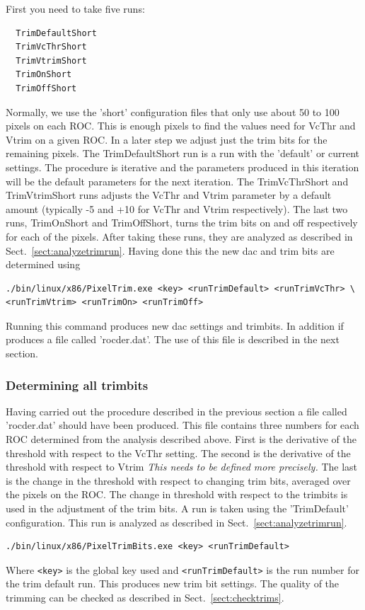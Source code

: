 First you need to take five runs:
\begin{verbatim}
  TrimDefaultShort
  TrimVcThrShort
  TrimVtrimShort
  TrimOnShort
  TrimOffShort
\end{verbatim}
Normally, we use the 'short' configuration files that only use about 50 to 100 pixels on each ROC. This is enough pixels to find the  values need for VcThr and Vtrim on a given ROC. In a later step we  adjust just the trim bits for the remaining pixels. The TrimDefaultShort run is a run with the 'default' or current settings. The procedure is iterative and the parameters produced in this iteration will be the default parameters for the next iteration. The TrimVcThrShort and TrimVtrimShort runs adjusts the VcThr and Vtrim parameter by a default amount (typically -5 and +10 for VcThr and Vtrim respectively). The last two runs, TrimOnShort and TrimOffShort, turns the trim bits on and off respectively for each of the pixels. 
After taking these runs, they are analyzed as described in Sect.~\ref{sect:analyzetrimrun}. Having done this the new dac and trim bits are determined using
\begin{verbatim}
./bin/linux/x86/PixelTrim.exe <key> <runTrimDefault> <runTrimVcThr> \
<runTrimVtrim> <runTrimOn> <runTrimOff>
\end{verbatim}
Running this command produces new dac settings and trimbits. In addition if produces a file called 'rocder.dat'. The use of this file is described in the next section.

\subsubsection{Determining all trimbits}
\label{sec:trimbits}
Having carried out the procedure described in the previous section a file called 'rocder.dat' should have been produced. This file contains three numbers for each ROC determined from the analysis described above. First is the derivative of the threshold with respect to the VcThr setting. The second is the derivative of the threshold with respect to Vtrim {\it This needs to be defined more precisely.} The last is the change in the threshold with respect to changing trim bits, averaged over the pixels on the ROC. The change in threshold with respect to the  trimbits is used in the adjustment of the trim bits. 
A run is taken using the 'TrimDefault' configuration. This run is analyzed as described in Sect.~\ref{sect:analyzetrimrun}.
\begin{verbatim}
./bin/linux/x86/PixelTrimBits.exe <key> <runTrimDefault>
\end{verbatim}
Where {\tt <key>} is the global key used and {\tt <runTrimDefault>} is the run number for the trim default run. This produces new trim bit settings. The quality of the trimming can be checked as described in Sect.~\ref{sect:checktrims}.



